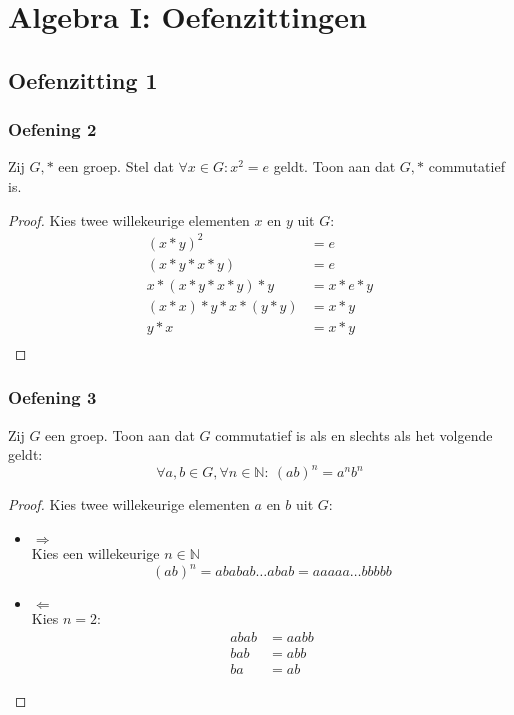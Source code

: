 \documentclass[main.tex]{subfiles}
\begin{document}
\chapter{Algebra I: Oefenzittingen}
\label{cha:algebra-i-oefenzittingen}

\section{Oefenzitting 1}


\subsection{Oefening 2}
\label{oz1-oef2}
Zij $G,*$ een groep.
Stel dat $\forall x \in G: x^{2} = e$ geldt.
Toon aan dat $G,*$ commutatief is.

\begin{proof}
  Kies twee willekeurige elementen $x$ en $y$ uit $G$:
  \[ 
  \begin{array}{rl}
  (x*y)^{2} &= e\\
  (x*y*x*y) &= e\\
  x*(x*y*x*y)*y &= x*e*y\\
  (x*x)*y*x*(y*y) &= x*y\\
  y*x &= x*y\\
  \end{array}
  \]
\end{proof}

\subsection{Oefening 3}
Zij $G$ een groep.
Toon aan dat $G$ commutatief is als en slechts als het volgende geldt:
\[ \forall a,b \in G, \forall n \in \mathbb{N}:\ (ab)^{n} = a^{n}b^{n} \]

\begin{proof}
  Kies twee willekeurige elementen $a$ en $b$ uit $G$:
  \begin{itemize}
  \item $\Rightarrow$\\
    Kies een willekeurige $n\in \mathbb{N}$
    \[ (ab)^{n} = ababab \ldots abab = aaaaa \ldots bbbbb \]
  \item $\Leftarrow$\\
    Kies $n=2$:
    \[ 
    \begin{array}{rl}
       abab &= aabb\\
       bab &= abb\\
       ba &= ab
    \end{array}
    \]
  \end{itemize}
\end{proof}
\end{document}
